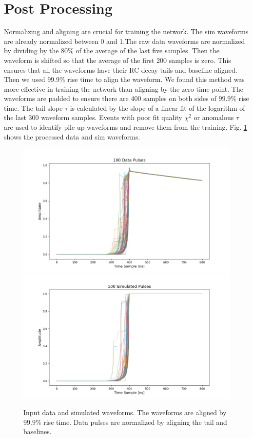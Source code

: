 \section{Post Processing}

Normalizing and aligning are crucial for training the network. The sim waveforms are already normalized between 0 and 1.The raw data waveforms are normalized by dividing by the $80\%$ of the average of the last five samples. Then the waveform is shifted so that the average of the first 200 samples is zero. This ensures that all the waveforms have their RC decay tails and baseline aligned. Then we used $99.9\%$ rise time to align the waveform. We found this method was more effective in training the network than aligning by the zero time point. The waveforms are padded to ensure there are 400 samples on both sides of $99.9\%$ rise time. The tail slope $\tau$ is calculated by the slope of a linear fit of the logarithm of the last 300 waveform samples. Events with poor fit quality $\chi^2$ or anomalous $\tau$ are used to identify pile-up waveforms and remove them from the training. Fig. \ref{ch7:figs:in_out} shows the processed data and sim waveforms.

\begin{figure}%
    \includegraphics[width=0.9\linewidth,trim={4pc 0cm 6pc 1cm},clip]{ch7/figs/all_data_pulses.png}
    \includegraphics[width=0.9\linewidth,trim={4pc 0cm 6pc 1cm},clip]{ch7/figs/all_simulated_pulses.png}
    \caption{Input data and simulated waveforms. The waveforms are aligned by $99.9\%$ rise time. Data pulses are normalized by aligning the tail and baselines.}
   \label{ch7:figs:in_out}
\end{figure}

